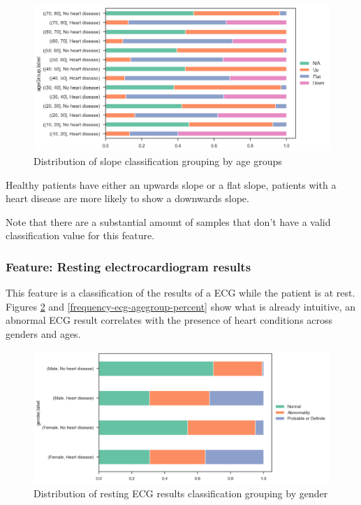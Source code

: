 \begin{figure}[H]
    \caption{Distribution of slope classification grouping by age groups}\label{frequency-slope-agegroup-percent}
    \centering
    \includegraphics[width=\linewidth]{media/frequency-04-agegroup-slope.png}
\end{figure}

Healthy patients have either an upwards slope or a flat slope, patients with a heart disease are more likely to show
a downwards slope.

Note that there are a substantial amount of samples that don't have a valid classification value for this feature.

\subsubsection{Feature: Resting electrocardiogram results}

This feature is a classification of the results of a ECG while the patient is at rest. Figures \ref{frequency-ecg-gender-percent}
and \ref{frequency-ecg-agegroup-percent} show what is already intuitive, an abnormal ECG result correlates with
the presence of heart conditions across genders and ages.

\begin{figure}[H]
    \caption{Distribution of resting ECG results classification grouping by gender}\label{frequency-ecg-gender-percent}
    \centering
    \includegraphics[width=\linewidth]{media/frequency-05-gender-ecg.png}
\end{figure}

